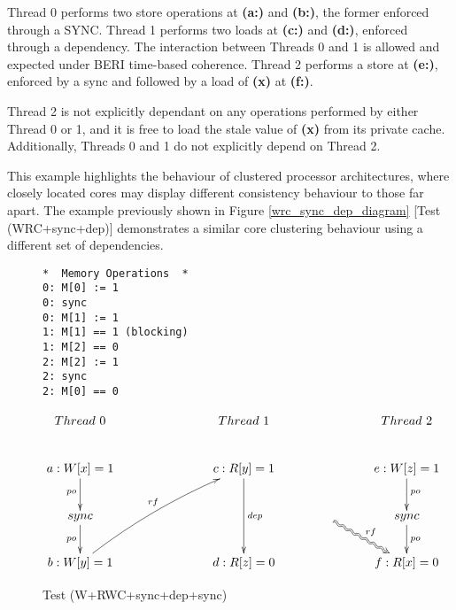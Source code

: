 		Thread 0 performs two store operations at \textbf{(a:)} and \textbf{(b:)}, the former enforced through a SYNC. Thread 1 performs two loads at \textbf{(c:)} and \textbf{(d:)}, enforced through a dependency. The interaction between Threads 0 and 1 is allowed and expected under BERI time-based coherence. Thread 2 performs a store at \textbf{(e:)}, enforced by a sync and followed by a load of \textbf{(x)} at \textbf{(f:)}.
		
		Thread 2 is not explicitly dependant on any operations performed by either Thread 0 or 1, and it is free to load the stale value of \textbf{(x)} from its private cache. Additionally, Threads 0 and 1 do not explicitly depend on Thread 2.
		
		This example highlights the behaviour of clustered processor architectures, where closely located cores may display different consistency behaviour to those far apart.
		The example previously shown in Figure \ref{wrc_sync_dep_diagram} [Test (WRC+sync+dep)] demonstrates a similar core clustering behaviour using a different set of dependencies. 

\begin{figure}[!h]
\begin{tcolorbox}[
colback=green!1!white,
colframe=green!75!black]
\begin{center}
\begin{BVerbatim}
*  Memory Operations  *
0: M[0] := 1
0: sync
0: M[1] := 1
1: M[1] == 1 (blocking)
1: M[2] == 0
2: M[2] := 1
2: sync
2: M[0] == 0
\end{BVerbatim}
\end{center}

\vspace{1mm}

\begin{displaymath}
	\xymatrix{
		Thread \ 0 & \ \ \ \ \ \  & Thread \ 1  & \ \ \ \ \ \  & Thread \ 2\\
		a: W[x] = 1 \ar[d]_{po} & & c: R[y] = 1 \ar[dd]^{dep} & & e: W[z] = 1 \ar[d]^{po} \\
		sync \ar[d]_{po} & & & \ \ \ \ar@2{~>}[dr]^{rf} & sync \ar[d]^{po} \\
		b: W[y] = 1 \ar@/^/@{->}[uurr]^{rf} & & d: R[z] = 0 & & f: R[x] = 0
	}
\end{displaymath}
\end{tcolorbox}
\caption{Test (W+RWC+sync+dep+sync)}
\label{w_rwc_sync_dep_diagram}
\end{figure}

